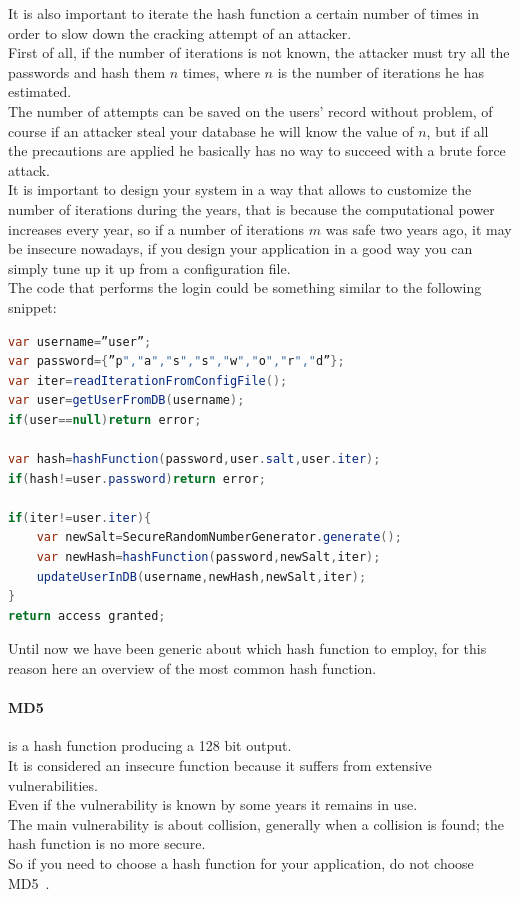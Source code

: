 It is also important to iterate the hash function a certain number of times in order to slow down the cracking attempt of an attacker.\\
First of all, if the number of iterations is not known, the attacker must try all the passwords and hash them $n$ times, where $n$ is the number of iterations he has estimated.\\
The number of attempts can be saved on the users’ record without problem, of course if an attacker steal your database he will know the value of $n$, but if all the precautions are applied he basically has no way to succeed with a brute force attack.\\
It is important to design your system in a way that allows to customize the number of iterations during the years, that is because the computational power increases every year, so if a number of iterations $m$ was safe two years ago, it may be insecure nowadays, if you design your application in a good way you can simply tune up it up from a configuration file.\\


The code that performs the login could be something similar to the following snippet:
\begin{lstlisting}[language=Java]
var username=”user”;
var password={”p","a","s","s","w","o","r","d”};
var iter=readIterationFromConfigFile();
var user=getUserFromDB(username);
if(user==null)return error;

var hash=hashFunction(password,user.salt,user.iter);
if(hash!=user.password)return error;

if(iter!=user.iter){
	var newSalt=SecureRandomNumberGenerator.generate();
	var newHash=hashFunction(password,newSalt,iter);
	updateUserInDB(username,newHash,newSalt,iter);
}
return access granted;
\end{lstlisting}

Until now we have been generic about which hash function to employ, for this reason here an overview of the most common hash function.



\paragraph{MD5} is a hash function producing a 128 bit output.\\
It is considered an insecure function because it suffers from extensive vulnerabilities.\\
Even if the vulnerability is known by some years it remains in use.\\
The main vulnerability is about collision, generally when a collision is found; the hash function is no more secure.\\
So if you need to choose a hash function for your application, do not choose MD5~\cite{md5}.\\


